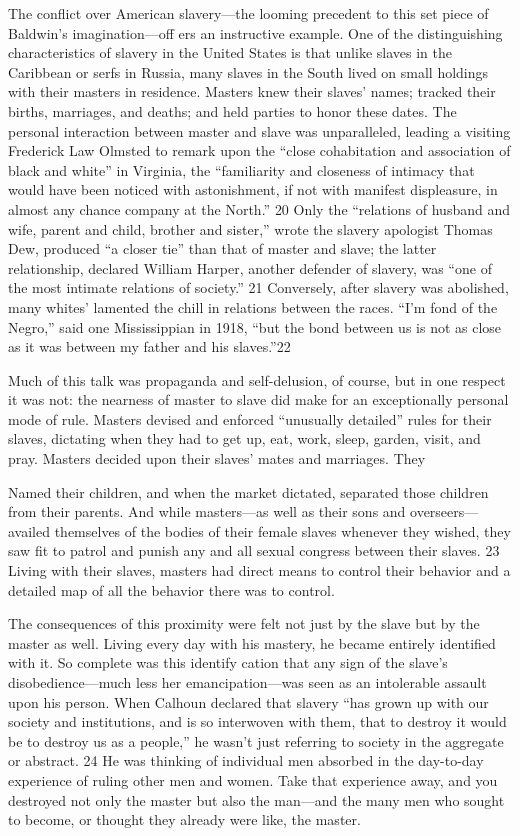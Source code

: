 The conflict over American slavery—the looming precedent to this set piece of Baldwin’s imagination—off ers an instructive example. One of the distinguishing characteristics of slavery in the United States is that unlike slaves in the Caribbean or serfs in Russia, many slaves in the South lived on small holdings with their masters in residence. Masters knew their slaves’ names; tracked their births, marriages, and deaths; and held parties to honor these dates. The personal interaction between master and slave was unparalleled, leading a visiting Frederick Law Olmsted to remark upon the “close cohabitation and association of black and white” in Virginia, the “familiarity and closeness of intimacy that would have been noticed with astonishment, if not with manifest displeasure, in almost any chance company at the North.” {\color{blue}20} Only the “relations of husband and wife, parent and child, brother and sister,” wrote the slavery apologist Thomas Dew, produced “a closer tie” than that of master and slave; the latter relationship, declared William Harper, another defender of slavery, was “one of the most intimate relations of society.” {\color{blue}21} Conversely, after slavery was abolished, many whites' lamented the chill in relations between the races. “I’m fond of the Negro,” said one Mississippian in 1918, “but the bond between us is not as close as it was between my father and his slaves.”{\color{blue}22}
 \par 
Much of this talk was propaganda and self-delusion, of course, but in one respect it was not: the nearness of master to slave did make for an exceptionally personal mode of rule. Masters devised and enforced “unusually detailed” rules for their slaves, dictating when they had to get up, eat, work, sleep, garden, visit, and pray. Masters decided upon their slaves’ mates and marriages. They
 \par 
Named their children, and when the market dictated, separated those children from their parents. And while masters—as well as their sons and overseers—availed themselves of the bodies of their female slaves whenever they wished, they saw fit to patrol and punish any and all sexual congress between their slaves. {\color{blue}23} Living with their slaves, masters had direct means to control their behavior and a detailed map of all the behavior there was to control.
 \par 
The consequences of this proximity were felt not just by the slave but by the master as well. Living every day with his mastery, he became entirely identified with it. So complete was this identify cation that any sign of the slave’s disobedience—much less her emancipation—was seen as an intolerable assault upon his person. When Calhoun declared that slavery “has grown up with our society and institutions, and is so interwoven with them, that to destroy it would be to destroy us as a people,” he wasn’t just referring to society in the aggregate or abstract. {\color{blue}24} He was thinking of individual men absorbed in the day-to-day experience of ruling other men and women. Take that experience away, and you destroyed not only the master but also the man—and the many men who sought to become, or thought they already were like, the master.
